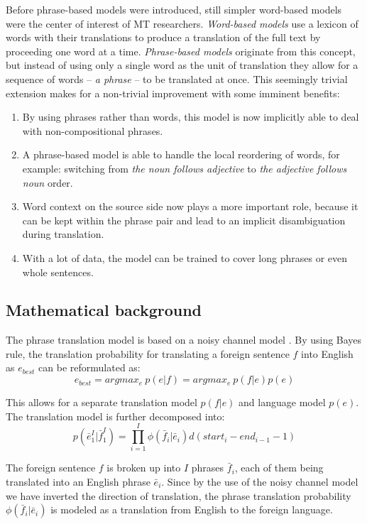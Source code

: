 Before phrase-based models were introduced, still simpler word-based models were
the center of interest of MT researchers.
\emph{Word-based models} use a lexicon of words with their translations to produce
a translation of the full text by proceeding one word at a time.
\emph{Phrase-based models} originate from this concept, but instead of using only
a single word as the unit of translation they allow for a sequence of words -- \emph{a phrase}
-- to be translated at once.
This seemingly trivial extension makes for a non-trivial improvement with some
imminent benefits:
\begin{enumerate}
  \item By using phrases rather than words, this model is now implicitly able to deal
    with non-compositional phrases.
  \item A phrase-based model is able to handle the local reordering of words, for example:
    switching from \emph{the noun follows adjective} to \emph{the adjective follows noun} order.
  \item Word context on the source side now plays a more important role, because it can be kept
    within the phrase pair and lead to an implicit disambiguation during translation.
  \item With a lot of data, the model can be trained to cover long phrases or even
    whole sentences.
\end{enumerate}

\subsection{Mathematical background}

The phrase translation model is based on a noisy channel model \citep{koehn:spbt}.
By using Bayes rule, the translation probability for translating a foreign sentence $f$
into English as $e_{best}$ can be reformulated as:
\begin{equation}
  e_{best} = argmax_{e}~p(e|f) =  argmax_{e}~p(f|e)p(e)
\end{equation}

This allows for a separate translation model $p(f|e)$ and language model $p(e)$.
The translation model is further decomposed into:
\begin{equation} \label{eq:tm}
  p(\bar{e}_1^I|\bar{f}_1^I) = \prod_{i=1}^I \phi(\bar{f}_i|\bar{e}_i) d(start_i - end_{i-1} - 1)
\end{equation}

The foreign sentence $f$ is broken up into $I$ phrases $\bar{f}_i$, each of them
being translated into an English phrase $\bar{e}_i$. Since by the use of the noisy channel
model we have inverted the direction of translation, the phrase translation probability
$\phi(\bar{f}_i|\bar{e}_i)$ is modeled as a translation from English to the foreign language.

